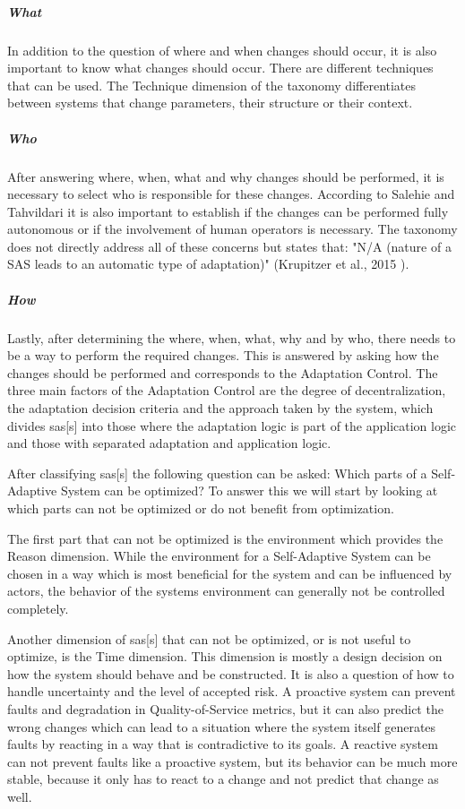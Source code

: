 \subparagraph*{What}
In addition to the question of where and when changes should occur, it is also important to know
what changes should occur. There are different techniques that can be used.
The Technique dimension of the taxonomy differentiates between systems that change parameters, their structure or their context.

\subparagraph*{Who}
After answering where, when, what and why changes should be performed, 
it is necessary to select who is responsible for these changes.
According to Salehie and Tahvildari it is also important to establish if the changes can be performed fully autonomous
or if the involvement of human operators is necessary.
The taxonomy does not directly address all of these concerns but states that:
"N/A (nature of a SAS leads to an automatic type of adaptation)" (Krupitzer et al., 2015 \cite{SurveyOnEngineeringApproaches}).

\subparagraph*{How}
Lastly, after determining the where, when, what, why and by who, there needs to be a way
to perform the required changes. This is answered by asking how the changes should be performed
and corresponds to the Adaptation Control.
The three main factors of the Adaptation Control are the degree of decentralization, the adaptation decision criteria
and the approach taken by the system, which divides \acrlong{sas}[s] into those where the adaptation logic is part of the application logic
and those with separated adaptation and application logic.

\noindent After classifying \acrlong{sas}[s] the following question can be asked: Which parts of a Self-Adaptive System can be optimized?
To answer this we will start by looking at which parts can not be optimized or do not benefit from optimization.

\noindent The first part that can not be optimized is the environment which provides the Reason dimension.
While the environment for a Self-Adaptive System can be chosen in a way which is most beneficial for the system
and can be influenced by actors,
the behavior of the systems environment can generally not be controlled completely.

\noindent Another dimension of \acrlong{sas}[s] that can not be optimized, or is not useful to optimize,
is the Time dimension. This dimension is mostly a design decision on how the system should behave and be constructed.
It is also a question of how to handle uncertainty and the level of accepted risk.
A proactive system can prevent faults and degradation in Quality-of-Service metrics,
but it can also predict the wrong changes which can lead to a situation where the system itself generates faults by
reacting in a way that is contradictive to its goals.
A reactive system can not prevent faults like a proactive system,
but its behavior can be much more stable, because it only has to react to a change and not predict that change as well.

